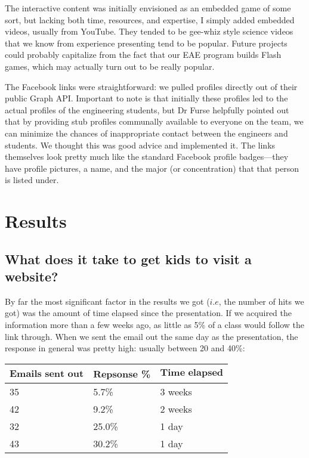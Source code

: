 \documentclass[11pt,a4paper]{article}
\begin{document}
The interactive content was initially envisioned as an embedded game of some sort, but lacking both time, resources, and expertise, I simply added embedded videos, usually from YouTube. They tended to be gee-whiz style science videos that we know from experience presenting tend to be popular. Future projects could probably capitalize from the fact that our EAE program builds Flash games, which may actually turn out to be really popular.

The Facebook links were straightforward: we pulled profiles directly out of their public Graph API. Important to note is that initially these profiles led to the actual profiles of the engineering students, but Dr Furse helpfully pointed out that by providing stub profiles communally available to everyone on the team, we can minimize the chances of inappropriate contact between the engineers and students. We thought this was good advice and implemented it. The links themselves look pretty much like the standard Facebook profile badges---they have profile pictures, a name, and the major (or concentration) that that person is listed under.

\section{Results}

\subsection{What does it take to get kids to visit a website?}

By far the most significant factor in the results we got ($\textit{i.e}$, the number of hits we got) was the amount of time elapsed since the presentation. If we acquired the information more than a few weeks ago, as little as 5\% of a class would follow the link through. When we sent the email out the same day as the presentation, the response in general was pretty high: usually between 20 and 40\%:

\begin{center}
\begin{tabular}{ l l l }
   $\textbf{Emails sent out}$ & $\textbf{Repsonse}$ \% & $\textbf{Time elapsed}$ \\
   \hline 
   35 & 5.7\% & 3 weeks \\
   42 & 9.2\% & 2 weeks \\
   32 & 25.0\% & 1 day \\
   43 & 30.2\% & 1 day \\
\end{tabular}
\end{center}
\end{document}
